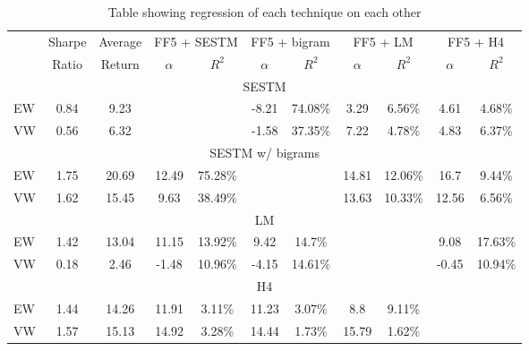 \begin{table}[!t]
\begin{center}
\begin{tabular}{lcccccccccc}
      \toprule
      & Sharpe &  Average &  \multicolumn{2}{c}{FF5 + SESTM} & \multicolumn{2}{c}{FF5 + bigram} & \multicolumn{2}{c}{FF5 + LM} & \multicolumn{2}{c}{FF5 + H4}\\
      \cmidrule(lr){4-5}
      \cmidrule(lr){6-7}
      \cmidrule(lr){8-9}
      \cmidrule(lr){10-11}
       & Ratio & Return &  $\alpha$ & $R^2$ & $\alpha$ & $R^2$ & $\alpha$ & $R^2$ & $\alpha$ & $R^2$ \\
      \midrule
      \multicolumn{11}{c}{SESTM} \\
EW & 0.84 & 9.23 & & & -8.21 & 74.08\% & 3.29 & 6.56\% & 4.61 & 4.68\%\\
VW & 0.56 & 6.32 & & & -1.58 & 37.35\% & 7.22 & 4.78\% & 4.83 & 6.37\%\\
   \multicolumn{11}{c}{SESTM w/ bigrams} \\
EW & 1.75 & 20.69 & 12.49 & 75.28\% & & & 14.81 & 12.06\% & 16.7 & 9.44\%\\
VW & 1.62 & 15.45 & 9.63 & 38.49\% & & & 13.63 & 10.33\% & 12.56 & 6.56\%\\
   \multicolumn{11}{c}{LM} \\
EW & 1.42 & 13.04 & 11.15 & 13.92\% & 9.42 & 14.7\% & & & 9.08 & 17.63\%\\
VW & 0.18 & 2.46 & -1.48 & 10.96\% & -4.15 & 14.61\% & & & -0.45 & 10.94\%\\
   \multicolumn{11}{c}{H4} \\
EW & 1.44 & 14.26 & 11.91 & 3.11\% & 11.23 & 3.07\% & 8.8 & 9.11\% & &  \\
VW & 1.57 & 15.13 & 14.92 & 3.28\% & 14.44 & 1.73\% & 15.79 & 1.62\% & &  \\
      \bottomrule
\end{tabular}
\caption{Table showing regression of each technique on each other}
\label{tab:regression-comparisons}
\end{center}
\end{table}

